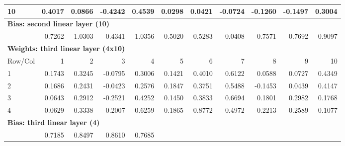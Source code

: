 \documentclass{article}
\begin{document}
\begin{tabular}{ |l|r|r|r|r|r|r|r|r|r|r| }
10 &  0.4017 & 0.0866 &-0.4242 & 0.4539 & 0.0298 & 0.0421 &-0.0724 &-0.1260 &-0.1497 & 0.3004 \\ 
  \hline
\multicolumn{11}{|l|}{\textbf{Bias: second linear layer (10)}} \\
  \hline
 & 0.7262 & 1.0303 & -0.4341 & 1.0356 & 0.5020 & 0.5283 & 0.0408 & 0.7571 & 0.7692 & 0.9097 \\
  \hline
\multicolumn{11}{|l|}{\textbf{Weights: third linear layer (4x10)}} \\
  \hline
Row/Col & 1 & 2 & 3 & 4 & 5 & 6 & 7 & 8 & 9 & 10 \\
  \hline
1 & 0.1743 & 0.3245 &-0.0795 & 0.3006 & 0.1421 & 0.4010 & 0.6122 &0.0588 & 0.0727 &0.4349 \\
2 & 0.1686 & 0.2431 &-0.0423 & 0.2576 & 0.1847 & 0.3751 & 0.5488 &-0.1453 & 0.0439 & 0.4147 \\
3 & 0.0643 & 0.2912 &-0.2521 & 0.4252 & 0.1450 & 0.3833 & 0.6694 &0.1801 & 0.2982 & 0.1768 \\
4 &-0.0629 & 0.3338 &-0.2007 & 0.6259 & 0.1865 & 0.8772 & 0.4972 &-0.2213 &-0.2589 & 0.1077 \\
  \hline
\multicolumn{11}{|l|}{\textbf{Bias: third linear layer (4)}} \\
  \hline
& 0.7185 & 0.8497 & 0.8610 & 0.7685 & & & & & & \\
  \hline
  
\end{tabular}
\end{document}
